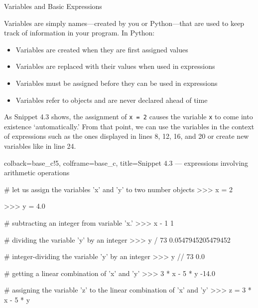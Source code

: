 \documentclass[a4paper,11pt]{book}
\numberwithin{figure}{chapter}
\numberwithin{table}{chapter}
\newcommand{\question}[1]{%
    \begin{tcolorbox}[colback=comp_c!10,colframe=comp_c,sidebyside align=top,width=\linewidth,before skip=1ex]
        #1
    \end{tcolorbox}
    \switchcolumn%
}
\newcommand{\note}[1]{%
    \begin{tcolorbox}[colback=white!0,colframe=white!10,width=\linewidth,before skip=1ex]
        #1
    \end{tcolorbox}
}
\begin{document}
\begin{paracol}{2}
	\question{\raggedright Variables and Basic Expressions}
	\note{Variables are simply names—created by you or Python—that are used to keep track of information in your program. In Python:
	\begin{itemize}
		\item Variables are created when they are first assigned values
		\item Variables are replaced with their values when used in expressions
		\item Variables must be assigned before they can be used in expressions
		\item Variables refer to objects and are never declared ahead of time
	\end{itemize}
    As Snippet 4.3 shows, the assignment of \texttt{x = 2} causes the variable \texttt{x} to come into existence `automatically.' From that point, we can use the variables in the context of expressions such as the ones displayed in lines 8, 12, 16, and 20 or create new variables like in line 24.
    }
\end{paracol}

\begin{pythoncode}[linenos=true,]{colback=base_c!5, colframe=base_c, title=\sffamily Snippet 4.3 --- expressions involving arithmetic operations}
	
# let us assign the variables 'x' and 'y' to two number objects
>>> x = 2

>>> y = 4.0	

# subtracting an integer from variable 'x.'
>>> x - 1
1

# dividing the variable 'y' by an integer
>>> y / 73
0.0547945205479452

# integer-dividing the variable 'y' by an integer
>>> y // 73
0.0

# getting a linear combination of 'x' and 'y'
>>> 3 * x - 5 * y
-14.0

# assigning the variable 'z' to the linear combination of 'x' and 'y'
>>> z = 3 * x - 5 * y

\end{pythoncode}
\end{document}
